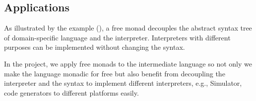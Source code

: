 \subsection{Applications} \label{b:fm:a}
As illustrated by the example (), a free monad decouples the abstract syntax tree of domain-specific language and the interpreter. Interpreters with different purposes can be implemented without changing the syntax.

In the project, we apply free monads to the intermediate language so not only we make the language monadic for free but also benefit from decoupling the interpreter and the syntax to implement different interpreters, e.g., Simulator, code generators to different platforms easily.